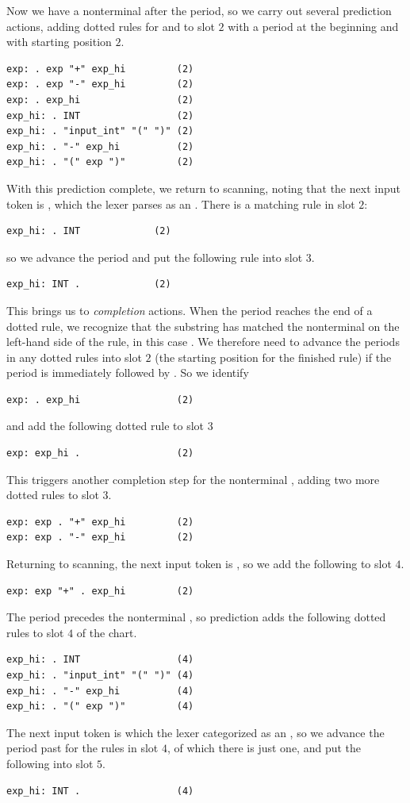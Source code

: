 \documentclass[7x10]{TimesAPriori_MIT}%
\numberwithin{theorem}{chapter}
\numberwithin{definition}{chapter}
\numberwithin{equation}{chapter}
\begin{document}
{Now we have a nonterminal after the period, so we carry out several
prediction actions, adding dotted rules for  and
 to slot $2$ with a period at the beginning and with
starting position $2$.
\begin{lstlisting}[escapechar=$]
exp: . exp "+" exp_hi         (2)
exp: . exp "-" exp_hi         (2)
exp: . exp_hi                 (2)
exp_hi: . INT                 (2)
exp_hi: . "input_int" "(" ")" (2)
exp_hi: . "-" exp_hi          (2)
exp_hi: . "(" exp ")"         (2)
\end{lstlisting}
With this prediction complete, we return to scanning, noting that the
next input token is , which the lexer parses as an
. There is a matching rule in slot $2$:
\begin{lstlisting}
exp_hi: . INT             (2)
\end{lstlisting}
so we advance the period and put the following rule into slot $3$.
\begin{lstlisting}
exp_hi: INT .             (2)
\end{lstlisting}
This brings us to \emph{completion} actions.  When the period reaches
the end of a dotted rule, we recognize that the substring
has matched the nonterminal on the left-hand side of the rule, in this case
. We therefore need to advance the periods in any dotted
rules into slot $2$ (the starting position for the finished rule) if
the period is immediately followed by . So we identify
\begin{lstlisting}
exp: . exp_hi                 (2)
\end{lstlisting}
and add the following dotted rule to slot $3$
\begin{lstlisting}
exp: exp_hi .                 (2)
\end{lstlisting}
This triggers another completion step for the nonterminal ,
adding two more dotted rules to slot $3$.
\begin{lstlisting}[escapechar=$]
exp: exp . "+" exp_hi         (2)
exp: exp . "-" exp_hi         (2)
\end{lstlisting}

Returning to scanning, the next input token is , so
we add the following to slot $4$.
\begin{lstlisting}[escapechar=$]
exp: exp "+" . exp_hi         (2)
\end{lstlisting}
The period precedes the nonterminal , so prediction adds
the following dotted rules to slot $4$ of the chart.
\begin{lstlisting}[escapechar=$]
exp_hi: . INT                 (4)
exp_hi: . "input_int" "(" ")" (4)
exp_hi: . "-" exp_hi          (4)
exp_hi: . "(" exp ")"         (4)
\end{lstlisting}
The next input token is  which the lexer categorized as an
, so we advance the period past  for the rules in
slot $4$, of which there is just one, and put the following into slot $5$.
\begin{lstlisting}[escapechar=$]
exp_hi: INT .                 (4)
\end{lstlisting}

}
\end{document}
